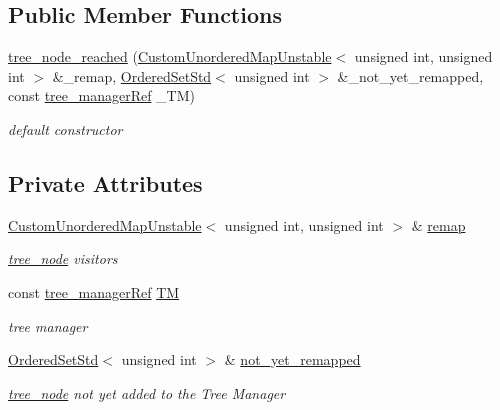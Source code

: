 \subsection*{Public Member Functions}
\begin{DoxyCompactItemize}
\item 
\hyperlink{structtree__node__reached_a70e5d64f5a1e008ac4c12e7193e54a66}{tree\+\_\+node\+\_\+reached} (\hyperlink{custom__map_8hpp_a8cbaceffc09790a885ec7e9c17809c69}{Custom\+Unordered\+Map\+Unstable}$<$ unsigned int, unsigned int $>$ \&\+\_\+remap, \hyperlink{custom__set_8hpp_a0e09160c8f8e7883e68096bbb174762e}{Ordered\+Set\+Std}$<$ unsigned int $>$ \&\+\_\+not\+\_\+yet\+\_\+remapped, const \hyperlink{tree__manager_8hpp_a96ff150c071ce11a9a7a1e40590f205e}{tree\+\_\+manager\+Ref} \+\_\+\+TM)
\begin{DoxyCompactList}\small\item\em default constructor \end{DoxyCompactList}\end{DoxyCompactItemize}
\subsection*{Private Attributes}
\begin{DoxyCompactItemize}
\item 
\hyperlink{custom__map_8hpp_a8cbaceffc09790a885ec7e9c17809c69}{Custom\+Unordered\+Map\+Unstable}$<$ unsigned int, unsigned int $>$ \& \hyperlink{structtree__node__reached_a105044038b38b5b45c904ae970af6660}{remap}
\begin{DoxyCompactList}\small\item\em \hyperlink{classtree__node}{tree\+\_\+node} visitors \end{DoxyCompactList}\item 
const \hyperlink{tree__manager_8hpp_a96ff150c071ce11a9a7a1e40590f205e}{tree\+\_\+manager\+Ref} \hyperlink{structtree__node__reached_a2248f7cf1f977c15d487f5bdcc6ed586}{TM}
\begin{DoxyCompactList}\small\item\em tree manager \end{DoxyCompactList}\item 
\hyperlink{custom__set_8hpp_a0e09160c8f8e7883e68096bbb174762e}{Ordered\+Set\+Std}$<$ unsigned int $>$ \& \hyperlink{structtree__node__reached_a9fc6bd45350ed85c68cb76ade1b49977}{not\+\_\+yet\+\_\+remapped}
\begin{DoxyCompactList}\small\item\em \hyperlink{classtree__node}{tree\+\_\+node} not yet added to the Tree Manager \end{DoxyCompactList}\end{DoxyCompactItemize}


